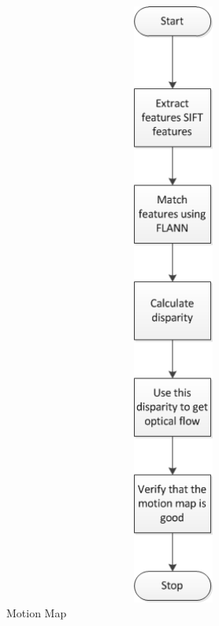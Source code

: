 \begin{figure} [ht] 
    \centering
    \begin{minipage}[b]{0.45\linewidth}
    \centering
    \includegraphics[width=20cm,height=20cm,keepaspectratio]{Pictures/Motionm.png}
    \caption{Motion Map}
    \label{fig:motionM}
    \end{minipage}
    \begin{minipage}[b]{0.45\linewidth}
    \centering

\end{minipage}
\end{figure}
